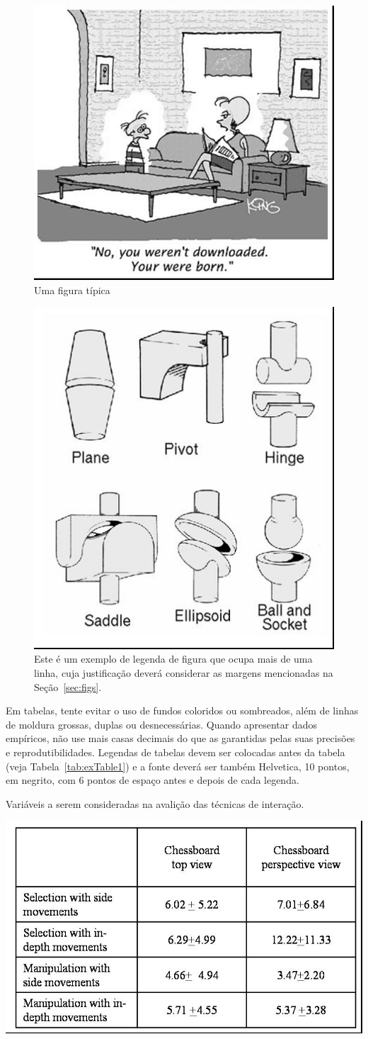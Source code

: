 \documentclass[12pt]{article}
\begin{document}
\begin{figure}[ht]
\centering
\includegraphics[width=.5\textwidth]{fig1.jpg}
\caption{Uma figura típica}
\label{fig:exampleFig1}
\end{figure}

\begin{figure}[ht]
\centering
\includegraphics[width=.3\textwidth]{fig2.jpg}
\caption{Este é um exemplo de legenda de figura que ocupa mais de uma linha, cuja justificação deverá considerar as margens mencionadas na Seção~\ref{sec:figs}.}
\label{fig:exampleFig2}
\end{figure}

Em tabelas, tente evitar o uso de fundos coloridos ou sombreados, além de linhas de moldura grossas, duplas ou desnecessárias. Quando apresentar dados empíricos, não use mais casas decimais do que as garantidas pelas suas precisões e reprodutibilidades. Legendas de tabelas devem ser colocadas antes da tabela (veja Tabela~\ref{tab:exTable1}) e a fonte deverá ser também Helvetica, 10 pontos, em negrito, com 6 pontos de espaço antes e depois de cada legenda.


\begin{table}[ht]
\centering
\caption{Variáveis a serem consideradas na avalição das técnicas de interação.}
\label{tab:exTable1}
\includegraphics[width=.7\textwidth]{table.jpg}
\end{table}
\end{document}
